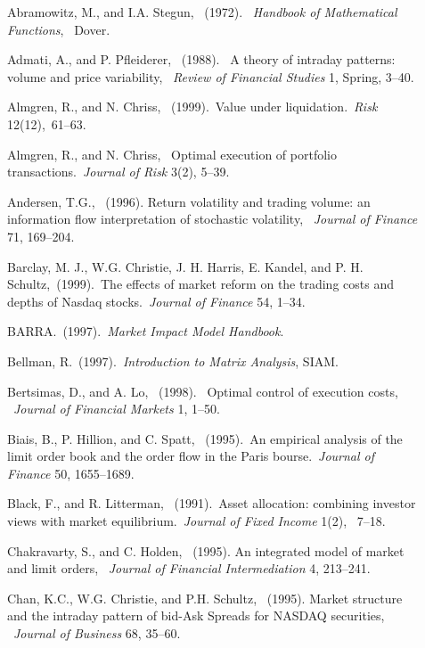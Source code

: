 
\begin{thebibliography}{99}
\end{thebibliography}

\begin{description}
 \item[] Abramowitz, M., and I.A. Stegun, ~(1972). ~{\it Handbook of Mathematical Functions}, ~Dover.
 \item[] Admati, A., and P. Pfleiderer, ~(1988). ~A theory of intraday patterns: volume and price variability, ~{\it Review of Financial Studies} 1, Spring, 3--40.
 \item[] Almgren, R., and N. Chriss, ~(1999).~Value under liquidation.~{\it Risk} 12(12),~61--63.
 \item[] Almgren, R., and N. Chriss, ~Optimal execution of portfolio transactions.~{\it Journal of Risk} 3(2), 5--39.
 \item[] Andersen, T.G., ~(1996). Return volatility and trading volume: an information flow interpretation of stochastic volatility, ~{\it Journal of Finance} 71, 169--204.
 \item[] Barclay, M. J., W.G. Christie, J. H. Harris, E. Kandel, and P. H. Schultz,~(1999).~The effects of market reform on the trading costs and depths of Nasdaq stocks.~{\it Journal of Finance} 54, 1--34.
 \item[] BARRA.~(1997).~{\it Market Impact Model Handbook}.
 \item[] Bellman, R.~(1997).~{\it Introduction to Matrix Analysis}, SIAM.
 \item[] Bertsimas, D., and A. Lo, ~(1998). ~Optimal control of execution costs, ~{\it Journal of Financial Markets} 1, 1--50.
 \item[] Biais, B., P. Hillion, and C. Spatt, ~(1995).~An empirical analysis of the limit order book and the order flow in the Paris bourse.~{\it Journal of Finance} 50, 1655--1689.
 \item[] Black, F., and R. Litterman, ~(1991).~Asset allocation: combining investor views  with market equilibrium.~{\it Journal of Fixed Income} 1(2), ~7--18.
 \item[] Chakravarty, S., and C. Holden, ~(1995). An integrated model of market and limit orders, ~{\it Journal of Financial Intermediation} 4, 213--241.
 \item[] Chan, K.C., W.G. Christie, and P.H. Schultz, ~(1995). Market structure and the intraday pattern of bid-Ask Spreads for NASDAQ securities, ~{\it Journal of Business} 68, 35--60.

\end{description}
